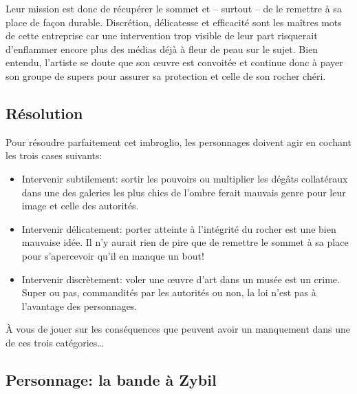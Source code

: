 Leur mission est donc de récupérer le sommet et -- surtout -- de le remettre à sa place de façon durable.
Discrétion, délicatesse et efficacité sont les maîtres mots de cette entreprise car une intervention trop visible de leur part risquerait d'enflammer encore plus des médias déjà à fleur de peau sur le sujet.
Bien entendu, l'artiste se doute que son œuvre est convoitée et continue donc à payer son groupe de supers pour assurer sa protection et celle de son rocher chéri.

\subsection{Résolution}

Pour résoudre parfaitement cet imbroglio, les personnages doivent agir en cochant les trois cases suivants:
\begin{itemize}
	\item Intervenir subtilement: sortir les pouvoirs ou multiplier les dégâts collatéraux dans une des galeries les plus chics de l'ombre ferait mauvais genre pour leur image et celle des autorités.
	\item Intervenir délicatement: porter atteinte à l'intégrité du rocher est une bien mauvaise idée. Il n'y aurait rien de pire que de remettre le sommet à sa place pour s'apercevoir qu'il en manque un bout!
	\item Intervenir discrètement: voler une œuvre d'art dans un musée est un crime. Super ou pas, commandités par les autorités ou non, la loi n'est pas à l'avantage des personnages.
\end{itemize}

À vous de jouer sur les conséquences que peuvent avoir un manquement dans une de ces trois catégories\dots

\subsection{Personnage: la bande à Zybil}


